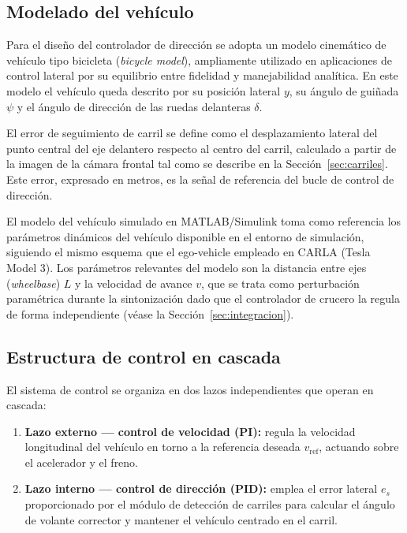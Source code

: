 \documentclass[12pt, a4paper]{article}
\begin{document}
\subsection{Modelado del vehículo}


Para el diseño del controlador de dirección se adopta un modelo cinemático de vehículo tipo bicicleta (\textit{bicycle model}), ampliamente utilizado en aplicaciones de control lateral por su equilibrio entre fidelidad y manejabilidad analítica. En este modelo el vehículo queda descrito por su posición lateral $y$, su ángulo de guiñada $\psi$ y el ángulo de dirección de las ruedas delanteras $\delta$.

El error de seguimiento de carril se define como el desplazamiento lateral del punto central del eje delantero respecto al centro del carril, calculado a partir de la imagen de la cámara frontal tal como se describe en la Sección~\ref{sec:carriles}. Este error, expresado en metros, es la señal de referencia del bucle de control de dirección.

El modelo del vehículo simulado en MATLAB/Simulink toma como referencia los parámetros dinámicos del vehículo disponible en el entorno de simulación, siguiendo el mismo esquema que el ego-vehicle empleado en CARLA (Tesla Model 3). Los parámetros relevantes del modelo son la distancia entre ejes (\textit{wheelbase}) $L$ y la velocidad de avance $v$, que se trata como perturbación paramétrica durante la sintonización dado que el controlador de crucero la regula de forma independiente (véase la Sección~\ref{sec:integracion}).

\subsection{Estructura de control en cascada}

El sistema de control se organiza en dos lazos independientes que operan en cascada:

\begin{enumerate}
    \item \textbf{Lazo externo — control de velocidad (PI):} regula la velocidad longitudinal del vehículo en torno a la referencia deseada $v_\text{ref}$, actuando sobre el acelerador y el freno.
    \item \textbf{Lazo interno — control de dirección (PID):} emplea el error lateral $e_s$ proporcionado por el módulo de detección de carriles para calcular el ángulo de volante corrector y mantener el vehículo centrado en el carril.
\end{enumerate}
\end{document}
